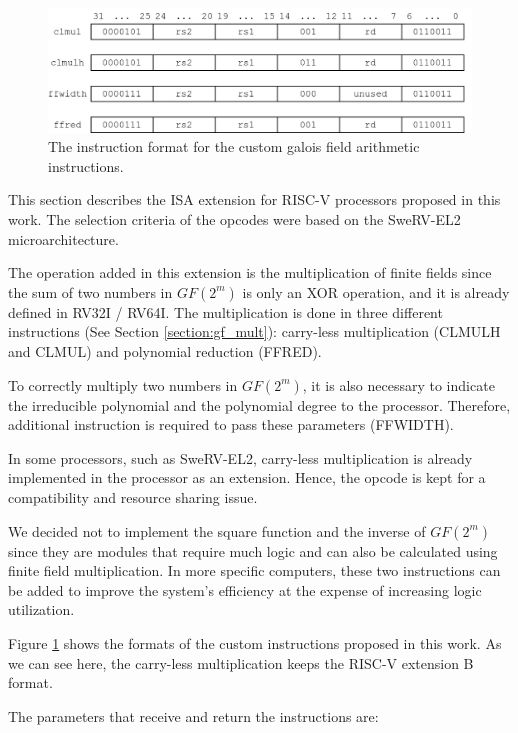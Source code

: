 \begin{figure}[tp]
    \centering
    \includegraphics[width=0.8\linewidth]{img/instr.png}
    \caption{The instruction format for the custom galois field arithmetic instructions.}
    \label{fig:instr}
\end{figure}

This section describes the ISA extension for RISC-V processors proposed in this work. The selection criteria
of the opcodes were based on the SweRV-EL2 \cite{marena2019risc} microarchitecture. 

The operation added in this extension is the multiplication of finite fields since the sum of two numbers in 
$GF(2^m)$ is only an XOR operation, and it is already defined in RV32I / RV64I. The multiplication is done in three different 
instructions (See Section \ref{section:gf_mult}): carry-less multiplication (CLMULH and CLMUL) and polynomial reduction (FFRED).

To correctly multiply two numbers in $GF(2^m)$, it is also necessary to indicate the irreducible polynomial and the polynomial 
degree to the processor. Therefore, additional instruction is required to pass these parameters (FFWIDTH).

In some processors, such as SweRV-EL2, carry-less multiplication is already implemented in the processor as an extension. Hence, 
the opcode is kept for a compatibility and resource sharing issue.

We decided not to implement the square function and the inverse of $GF(2^m)$ since they are modules that require much logic 
and can also be calculated using finite field multiplication. In more specific computers, these two instructions can be added to 
improve the system's efficiency at the expense of increasing logic utilization.

Figure \ref{fig:instr} shows the formats of the custom instructions proposed in this work. As we can see here, the carry-less multiplication 
keeps the RISC-V extension B format. 

The parameters that receive and return the instructions are:

